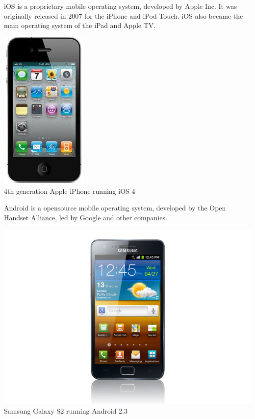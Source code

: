 iOS is a proprietary mobile operating system, developed by Apple Inc. It was originally released in 2007 for the iPhone and iPod Touch. iOS also became the main operating system of the iPad and Apple TV.

\begin{centering}
\includegraphics[scale=0.5]{images/iphone4.jpg}\\{4th generation Apple iPhone running iOS 4}\\
\end{centering}

Android is a opensource mobile operating system, developed by the Open Handset Alliance, led by Google and other companies.\cite{Inc.2012}

\begin{centering}
\includegraphics[scale=0.35]{images/android_sgs2.jpg}\\{Samsung Galaxy S2 running Android 2.3}\\
\end{centering}


